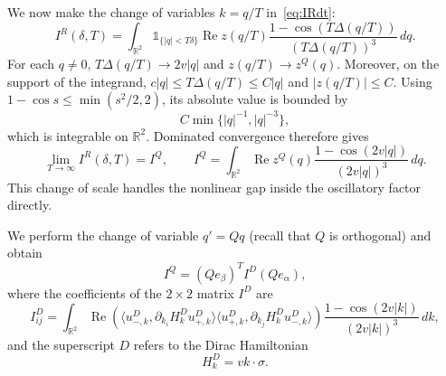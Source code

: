 \documentclass[a4paper,11pt]{article}
\theoremstyle{plain}
\theoremstyle{remark}
\def\R{{\mathbb R}}
\def\1{{\mathds 1}}
\begin{document}
We now make the change of variables $k=q/T$ in~\eqref{eq:IRdt}:
\begin{equation}\label{eq:scaled_cone}
I^R(\delta,T)=\int_{\R^2}\1_{\{|q|<T\delta\}}
\operatorname{Re}z(q/T)
\frac{1-\cos(T\Delta(q/T))}{(T\Delta(q/T))^3}\,dq.
\end{equation}
For each $q\ne0$, $T\Delta(q/T)\to2v|q|$ and
$z(q/T)\to z^Q(q)$. Moreover, on the support of the integrand,
$c|q|\le T\Delta(q/T)\le C|q|$ and $|z(q/T)|\le C$.
Using $1-\cos s\le\min(s^2/2,2)$, its absolute value is bounded by
\[
C\min\{|q|^{-1},|q|^{-3}\},
\]
which is integrable on $\R^2$. Dominated convergence therefore gives
\begin{equation}\label{eq:linear_cone_limit}
\lim_{T\to\infty}I^R(\delta,T)=I^Q,
\qquad
I^Q=\int_{\R^2}\operatorname{Re}z^Q(q)
\frac{1-\cos(2v|q|)}{(2v|q|)^3}\,dq.
\end{equation}
This change of scale handles the nonlinear gap inside the oscillatory
factor directly.

We perform the change of variable $q'=Qq$ (recall that $Q$ is orthogonal)
and obtain
\[
I^Q=(Qe_\beta)^T I^D(Qe_\alpha),
\]
where the coefficients of the $2\times2$ matrix $I^D$ are
\[
I_{ij}^D=\int_{\R^2}
\operatorname{Re}\left(
\langle u^D_{-,k},\partial_{k_i}H_k^D u^D_{+,k}\rangle
\langle u^D_{+,k},\partial_{k_j}H_k^D u^D_{-,k}\rangle\right)
\frac{1-\cos(2v|k|)}{(2v|k|)^3}\,dk,
\]
and the superscript $D$ refers to the Dirac Hamiltonian
\[
H_k^D=vk\cdot\sigma.
\]
\end{document}
